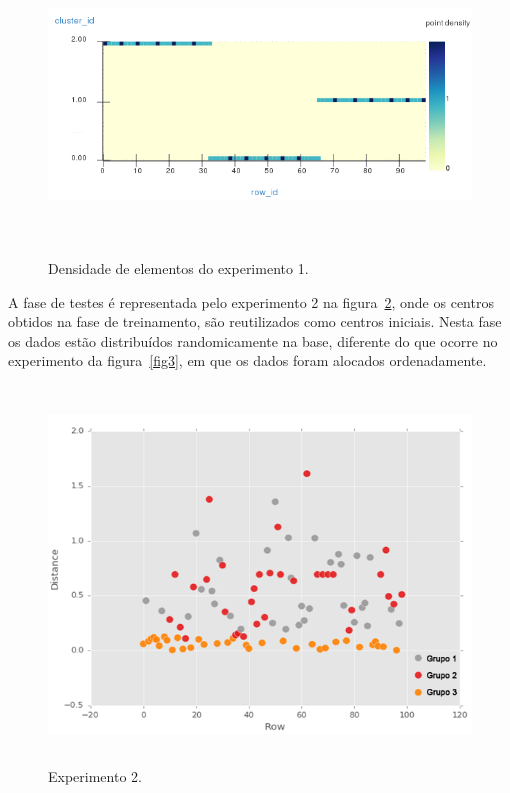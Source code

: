 \begin{figure}[!h]
\centering
\includegraphics[width = 14cm, height = 8cm]{figuras/densidade1.png}
\caption{\scriptsize{Densidade de elementos do experimento 1.}}
\label{fig4}
\end{figure}

\newpage

\indent A fase de testes é representada pelo experimento 2 na figura~\ref{exp2}, onde os centros obtidos na fase de treinamento, são reutilizados como centros iniciais. Nesta fase os dados estão distribuídos randomicamente na base, diferente do que ocorre no experimento da figura~\ref{fig3}, em que os dados foram alocados ordenadamente.

\begin{figure}[!h]
\centering
\includegraphics[width = 13cm, height = 10cm]{figuras/aleatorio1.png}
\caption{\scriptsize{Experimento 2.}}
\label{exp2}
\end{figure}

